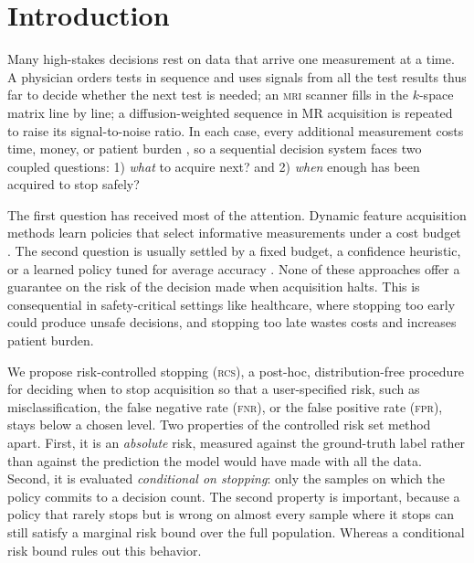 \section{Introduction}
Many high-stakes decisions rest on data that arrive one measurement at a time. 
A physician orders tests in sequence and uses signals from all the test results thus far to decide whether the next test is needed; an \textsc{mri} scanner fills in the $k$-space matrix line by line; a diffusion-weighted sequence in MR acquisition is repeated to raise its signal-to-noise ratio. 
In each case, every additional measurement costs time, money, or patient burden \citep{lustig2008compressed,zbontar2018fastmri}, so a sequential decision system faces two coupled questions: 1) \emph{what} to acquire next? and 2) \emph{when} enough has been acquired to stop safely?


The first question has received most of the attention. 
Dynamic feature acquisition methods learn policies that select informative measurements under a cost budget \citep{bakker2020experimental,singhal2023feasibility,covert2023learning,ASMR}. 
The second question is usually settled by a fixed budget, a confidence heuristic, or a learned policy tuned for average accuracy \citep{jafa-2018,bakker2020experimental}. 
None of these approaches offer a guarantee on the risk of the decision made when acquisition halts. 
This is consequential in safety-critical settings like healthcare, where stopping too early could produce unsafe decisions, and stopping too late wastes costs and increases patient burden.

We propose risk-controlled stopping (\textsc{rcs}), a post-hoc, distribution-free procedure for deciding when to stop acquisition so that a user-specified risk, such as misclassification, the false negative rate (\textsc{fnr}), or the false positive rate (\textsc{fpr}), stays below a chosen level. 
Two properties of the controlled risk set \gls{method} apart. 
First, it is an \emph{absolute} risk, measured against the ground-truth label rather than against the prediction the model would have made with all the data. 
Second, it is evaluated \emph{conditional on stopping}: only the samples on which the policy commits to a decision count. 
The second property is important, because a policy that rarely stops but is wrong on almost every sample where it stops can still satisfy a marginal risk bound over the full population.
Whereas a conditional risk bound rules out this behavior. 

